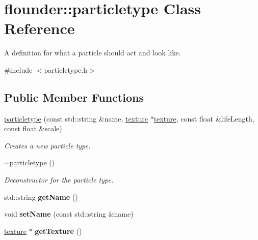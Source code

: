 \hypertarget{classflounder_1_1particletype}{}\section{flounder\+:\+:particletype Class Reference}
\label{classflounder_1_1particletype}


A definition for what a particle should act and look like.  




{\ttfamily \#include $<$particletype.\+h$>$}

\subsection*{Public Member Functions}
\begin{DoxyCompactItemize}
\item 
\hyperlink{classflounder_1_1particletype_a5b67bec1305e49290ee3d7d4a318512d}{particletype} (const std\+::string \&name, \hyperlink{classflounder_1_1texture}{texture} $\ast$\hyperlink{classflounder_1_1texture}{texture}, const float \&life\+Length, const float \&scale)
\begin{DoxyCompactList}\small\item\em Creates a new particle type. \end{DoxyCompactList}\item 
\hyperlink{classflounder_1_1particletype_a8a084366ea397be49cf5ac804e7bc315}{$\sim$particletype} ()
\begin{DoxyCompactList}\small\item\em Deconstructor for the particle type. \end{DoxyCompactList}\item 
\mbox{\label{classflounder_1_1particletype_a3da53a4e7930d68b56a2971ddbaaa4df}} 
std\+::string {\bfseries get\+Name} ()
\item 
\mbox{\label{classflounder_1_1particletype_adaa2977206f302133d7a1f7e1cc947e1}} 
void {\bfseries set\+Name} (const std\+::string \&name)
\item 
\mbox{\label{classflounder_1_1particletype_a074fd73b5c052fdc57c42f94947ca900}} 
\hyperlink{classflounder_1_1texture}{texture} $\ast$ {\bfseries get\+Texture} ()
\item 

\end{DoxyCompactItemize}
